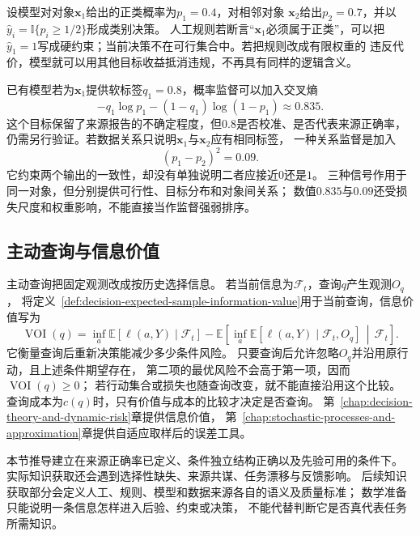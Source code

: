 \begin{example}[同一对象上的三种监督]
  \label{ex:future-supervision-three-forms}
  设模型对对象\(\bm x_1\)给出的正类概率为\(p_1=0.4\)，对相邻对象
  \(\bm x_2\)给出\(p_2=0.7\)，并以
  \(\widehat y_i=\mathbb{I}\{p_i\geq1/2\}\)形成类别决策。
  人工规则若断言“\(\bm x_1\)必须属于正类”，可以把
  \(\widehat y_1=1\)写成硬约束；当前决策不在可行集合中。若把规则改成有限权重的
  违反代价，模型就可以用其他目标收益抵消违规，不再具有同样的逻辑含义。

  已有模型若为\(\bm x_1\)提供软标签\(q_1=0.8\)，概率监督可以加入交叉熵
  \[
    -q_1\log p_1-(1-q_1)\log(1-p_1)
    \approx0.835.
  \]
  这个目标保留了来源报告的不确定程度，但\(0.8\)是否校准、是否代表来源正确率，
  仍需另行验证。若数据关系只说明\(\bm x_1\)与\(\bm x_2\)应有相同标签，
  一种关系监督是加入
  \[
    (p_1-p_2)^2=0.09.
  \]
  它约束两个输出的一致性，却没有单独说明二者应接近\(0\)还是\(1\)。
  三种信号作用于同一对象，但分别提供可行性、目标分布和对象间关系；
  数值\(0.835\)与\(0.09\)还受损失尺度和权重影响，不能直接当作监督强弱排序。
\end{example}

\subsection{主动查询与信息价值}
\label{sec:future-passive-information-active-query}

主动查询把固定观测改成按历史选择信息。
若当前信息为$\mathcal{F}_t$，查询$q$产生观测$O_q$，
将定义~\ref{def:decision-expected-sample-information-value}用于当前查询，信息价值写为
\[
  \operatorname{VOI}(q)
  =
  \inf_a
  \mathbb{E}[\ell(a,Y)\mid\mathcal{F}_t]
  -
  \mathbb{E}\!\left[
    \inf_a
    \mathbb{E}[\ell(a,Y)\mid\mathcal{F}_t,O_q]
    \,\middle|\,
    \mathcal{F}_t
  \right].
\]
它衡量查询后重新决策能减少多少条件风险。
只要查询后允许忽略$O_q$并沿用原行动，且上述条件期望存在，
第二项的最优风险不会高于第一项，因而$\operatorname{VOI}(q)\geq0$；
若行动集合或损失也随查询改变，就不能直接沿用这个比较。
查询成本为$c(q)$时，只有价值与成本的比较才决定是否查询。
第~\ref{chap:decision-theory-and-dynamic-risk}章提供信息价值，
第~\ref{chap:stochastic-processes-and-approximation}章提供自适应取样后的误差工具。

本节推导建立在来源正确率已定义、条件独立结构正确以及先验可用的条件下。
实际知识获取还会遇到选择性缺失、来源共谋、任务漂移与反馈影响。
后续知识获取部分会定义人工、规则、模型和数据来源各自的语义及质量标准；
数学准备只能说明一条信息怎样进入后验、约束或决策，
不能代替判断它是否真代表任务所需知识。

